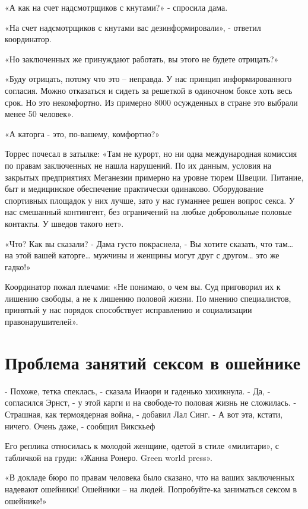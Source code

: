 \documentclass[10pt,final]{book}
\begin{document}
«А как на счет надсмотрщиков с кнутами?» - спросила дама.

«На счет надсмотрщиков с кнутами вас дезинформировали», - ответил координатор.

«Но заключенных же принуждают работать, вы этого не будете отрицать?»

«Буду отрицать, потому что это -- неправда. У нас принцип информированного согласия. Можно отказаться и сидеть за решеткой в одиночном боксе хоть весь срок. Но это некомфортно. Из примерно 8000 осужденных в стране это выбрали менее 50 человек».

«А каторга - это, по-вашему, комфортно?»

Торрес почесал в затылке: «Там не курорт, но ни одна международная комиссия по правам заключенных не нашла нарушений. По их данным, условия на закрытых предприятиях Меганезии примерно на уровне тюрем Швеции. Питание, быт и медицинское обеспечение практически одинаково. Оборудование спортивных площадок у них лучше, зато у нас гуманнее решен вопрос секса. У нас смешанный контингент, без ограничений на любые добровольные половые контакты. У шведов такого нет».

«Что? Как вы сказали? - Дама густо покраснела, - Вы хотите сказать, что там\ldots{} на этой вашей каторге\ldots{} мужчины и женщины могут друг с другом\ldots{} это же гадко!»

Координатор пожал плечами: «Не понимаю, о чем вы. Суд приговорил их к лишению свободы, а не к лишению половой жизни. По мнению специалистов, принятый у нас порядок способствует исправлению и социализации правонарушителей».



\chapter{Проблема занятий сексом в ошейнике}


- Похоже, тетка спеклась, - сказала Инаори и гаденько хихикнула.
- Да, - согласился Эрнст, - у этой карги и на свободе-то половая жизнь не сложилась.
- Страшная, как термоядерная война, - добавил Лал Синг.
- А вот эта, кстати, ничего. Очень даже, - сообщил Викскьеф

Его реплика относилась к молодой женщине, одетой в стиле «милитари», с табличкой на груди: «Жанна Ронеро. Green world press».

«В докладе бюро по правам человека было сказано, что на ваших заключенных надевают ошейники! Ошейники -- на людей. Попробуйте-ка заниматься сексом в ошейнике!»
\end{document}
